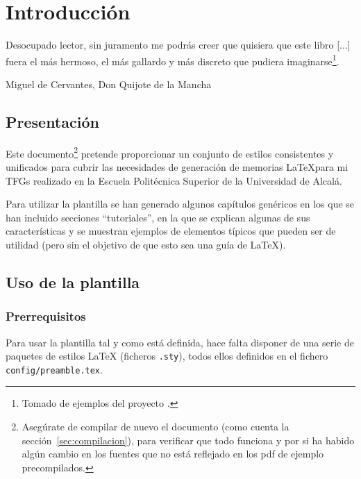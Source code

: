 
\chapter{Introducción}
\label{cha:introduccion}

\begin{FraseCelebre}
  \begin{Frase}
    Desocupado lector, sin juramento me podrás creer que quisiera que este
    libro [...] fuera el más hermoso, el más gallardo y más discreto que
    pudiera imaginarse\footnote{Tomado de ejemplos del proyecto \texis{}.}.
  \end{Frase}
  \begin{Fuente}
    Miguel de Cervantes, Don Quijote de la Mancha
  \end{Fuente}
\end{FraseCelebre}


\section{Presentación}
\label{sec:presentacion}


Este documento\footnote{Asegúrate de compilar de nuevo el documento
  (como cuenta la sección~\ref{sec:compilacion}), para verificar que
  todo funciona y por si ha habido algún cambio en los fuentes que no
  está reflejado en los pdf de ejemplo precompilados.} pretende
proporcionar un conjunto de estilos consistentes y unificados para
cubrir las necesidades de generación de memorias \LaTeX{}para mi
 TFGs realizado en la Escuela Politécnica Superior de la Universidad de Alcalá.

Para utilizar la plantilla se han generado algunos capítulos genéricos
en los que se han incluido secciones ``tutoriales'', en la que se
explican algunas de sus características y se muestran ejemplos de
elementos típicos que pueden ser de utilidad (pero sin el objetivo de
que esto sea una guía de \LaTeX{}).


\section{Uso de la plantilla}
\label{sec:uso-generico-de}


\subsection{Prerrequisitos}
\label{sec:prerrequisitos}

Para usar la plantilla tal y como está definida, hace falta disponer de
una serie de paquetes de estilos \LaTeX{} (ficheros \texttt{.sty}),
todos ellos definidos en el fichero \texttt{config/preamble.tex}.

